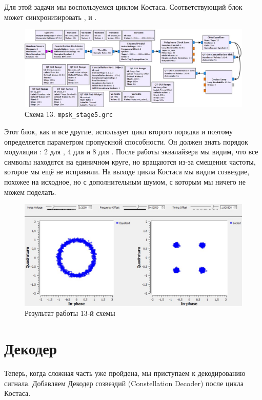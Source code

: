 \documentclass[a4paper, 12pt]{report}
\begin{document}
	Для этой задачи мы воспользуемся циклом Костаса. Соответствующий блок может синхронизировать ,  и .
	\begin{figure}[H]
		\centering
		\includegraphics[width=1.0\textwidth]{37.jpg}
		\caption{Схема 13. \texttt{mpsk\_stage5.grc}}
		\label{fig:37}
	\end{figure}
	Этот блок, как и все другие, использует цикл второго порядка и поэтому определяется параметром пропускной способности. Он должен знать порядок модуляции : 2 для , 4 для  и 8 для . 
	После работы эквалайзера мы видим, что все символы находятся на единичном круге, но вращаются из-за смещения частоты, которое мы ещё не исправили. На выходе цикла Костаса мы видим созвездие, похожее на исходное, но с дополнительным шумом, с которым мы ничего не можем поделать.
	\begin{figure}[H]
		\centering
		\includegraphics[width=1.0\textwidth]{38.jpg}
		\caption{Результат работы 13-й схемы}
		\label{fig:38}
	\end{figure}
	
	\chapter{Декодер}
	Теперь, когда сложная часть уже пройдена, мы приступаем к декодированию сигнала. Добавляем Декодер созвездий (Constellation Decoder) после цикла Костаса. 
	
\end{document}
